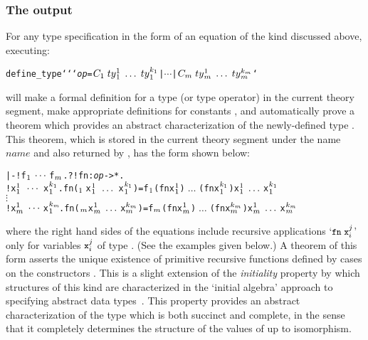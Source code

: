 \subsubsection{The output}\label{define-type-output}

\noindent For any type specification
in the form of an equation of the kind discussed above, executing:

{\def\op{{\normalsize\sl op}}
\begin{hol}
\begin{alltt}
   define\_type `` `{\op} = \(C\sb{1}\;ty{}\sb{1}\sp{1}\;\ldots\;ty{}\sb{1}\sp{k\sb{1}} \) | \(\cdots\) | \(C\sb{m}\;ty{}\sb{m}\sp{1}\;\ldots\;ty{}\sb{m}\sp{k\sb{m}}\)`
\end{alltt}\end{hol}}

\noindent will make a formal definition for a
type (or  type operator) 
in the current theory segment, make appropriate definitions for
constants  ,
and automatically prove a theorem which
provides an abstract
characterization
of the newly-defined type .  This theorem, which is
stored in the current theory segment under the name $name$ and also returned by
, has the form shown below:

{\def\op{{\normalsize\sl op}}
\begin{hol}\begin{alltt}
   |- !f\(\sb{1}\:\cdots\:\)f\(\sb{m}\). ?!fn:{\op}->*.
         !x\(\sb{1}\sp{1}\;\,\cdots\,\;\)x\(\sb{1}\sp{k\sb{1}}\). fn(\(\sb{1}\,\) x\(\sb{1}\sp{1}\;\,\ldots\,\;\)x\(\sb{1}\sp{k\sb{1}}\)) = f\(\sb{1}\) (fn x\(\sb{1}\sp{1}\))\(\;\ldots\;\)(fn x\(\sb{1}\sp{k\sb{1}}\)) x\(\sb{1}\sp{1}\;\ldots\;\)x\(\sb{1}\sp{k\sb{1}}\)
                                      \(\vdots\)
         !x\(\sb{m}\sp{1}\;\cdots\;\)x\(\sb{1}\sp{k\sb{m}}\!\). fn(\(\sb{m}\) x\(\sb{m}\sp{1}\;\ldots\;\)x\(\sb{m}\sp{k\sb{m}}\)) = f\(\sb{m}\) (fn x\(\sb{m}\sp{1}\))\(\;\ldots\;\)(fn x\(\sb{m}\sp{k\sb{m}}\)) x\(\sb{m}\sp{1}\;\ldots\;\)x\(\sb{m}\sp{k\sb{m}}\)
\end{alltt}\end{hol}}


\noindent where the right hand sides of the equations include recursive
applications `$\ml{fn}\;\ml{x}_i^j$' only for variables  $\ml{x}_i^j$ of type
.  (See the examples given below.) A theorem of this form asserts the
unique existence of primitive recursive functions defined by cases on the
constructors .  This is a slight
extension of the {\it initiality\/} property by which
structures of this kind are characterized in the `initial algebra' approach to
specifying abstract data types~\cite{goguen}.  This property provides an
abstract characterization of the type  which is both succinct and
complete, in the sense that it completely determines the structure of the
values of  up to isomorphism.

